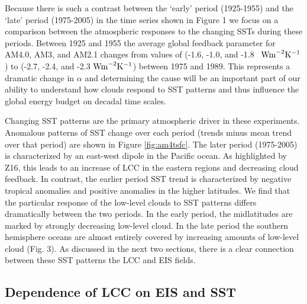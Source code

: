 Because there is such a contrast between the `early' period (1925-1955) and the `late' period (1975-2005) in the time series shown in Figure 1 we focus on a comparison between the atmospheric responses to the changing SSTs during these periods.  Between 1925 and 1955 the average global feedback parameter for AM4.0, AM3, and AM2.1 changes from values of (-1.6, -1.0, and -1.8 \, $\rm{W m}^{-2} K^{-1}$) to (-2.7, -2.4, and -2.3 $\rm{W m}^{-2} K^{-1}$) between 1975 and 1989.  
This represents a dramatic change in $\alpha$ and determining the cause will be an important part of our ability to understand how clouds respond to SST patterns and thus influence the global energy budget on decadal time scales.  

Changing SST patterns are the primary atmospheric driver in these experiments.
Anomalous patterns of SST change over each period (trends minus mean trend over that period) are shown in Figure \ref{fig:am4tsfc}.  The later period (1975-2005) is characterized by an east-west dipole in the Pacific ocean.  
As highlighted by Z16, this leads to an increase of LCC in the eastern regions and decreasing cloud feedback.  In contrast, the earlier period SST trend is characterized by negative tropical anomalies and positive anomalies in the higher latitudes.  
We find that the particular response of the low-level clouds to SST patterns differs dramatically between the two periods.  In the early period, the midlatitudes are marked by strongly decreasing low-level cloud.  In the late period the southern hemisphere oceans are almost entirely covered by increasing amounts of low-level cloud (Fig. 3).   
As discussed in the next two sections, there is a clear connection between these SST patterns\added{,}  the LCC\added{,} and EIS fields. 


\subsection{Dependence of LCC on EIS and SST}

